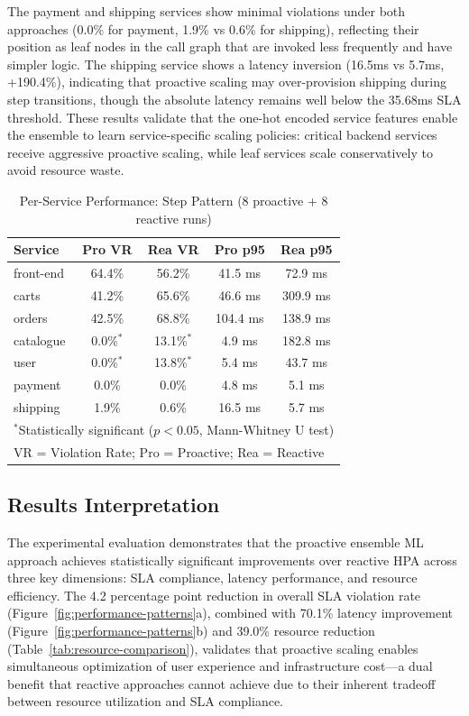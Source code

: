 \documentclass[conference]{IEEEtran}
\begin{document}
The payment and shipping services show minimal violations under both approaches (0.0\% for payment, 1.9\% vs 0.6\% for shipping), reflecting their position as leaf nodes in the call graph that are invoked less frequently and have simpler logic. The shipping service shows a latency inversion (16.5ms vs 5.7ms, +190.4\%), indicating that proactive scaling may over-provision shipping during step transitions, though the absolute latency remains well below the 35.68ms SLA threshold. These results validate that the one-hot encoded service features enable the ensemble to learn service-specific scaling policies: critical backend services receive aggressive proactive scaling, while leaf services scale conservatively to avoid resource waste.

\begin{table}[htbp]
\caption{Per-Service Performance: Step Pattern (8 proactive + 8 reactive runs)}
\begin{center}
\small
\begin{tabular}{|l|c|c|c|c|}
\hline
\textbf{Service} & \textbf{Pro VR} & \textbf{Rea VR} & \textbf{Pro p95} & \textbf{Rea p95} \\
\hline
front-end & 64.4\% & 56.2\% & 41.5 ms & 72.9 ms \\
carts & 41.2\% & 65.6\% & 46.6 ms & 309.9 ms \\
orders & 42.5\% & 68.8\% & 104.4 ms & 138.9 ms \\
catalogue & 0.0\%$^*$ & 13.1\%$^*$ & 4.9 ms & 182.8 ms \\
user & 0.0\%$^*$ & 13.8\%$^*$ & 5.4 ms & 43.7 ms \\
payment & 0.0\% & 0.0\% & 4.8 ms & 5.1 ms \\
shipping & 1.9\% & 0.6\% & 16.5 ms & 5.7 ms \\
\hline
\multicolumn{5}{l}{\footnotesize $^*$Statistically significant ($p < 0.05$, Mann-Whitney U test)} \\
\multicolumn{5}{l}{\footnotesize VR = Violation Rate; Pro = Proactive; Rea = Reactive} \\
\end{tabular}
\label{tab:per-service-step}
\end{center}
\end{table}

\subsection{Results Interpretation}

The experimental evaluation demonstrates that the proactive ensemble ML approach achieves statistically significant improvements over reactive HPA across three key dimensions: SLA compliance, latency performance, and resource efficiency. The 4.2 percentage point reduction in overall SLA violation rate (Figure~\ref{fig:performance-patterns}a), combined with 70.1\% latency improvement (Figure~\ref{fig:performance-patterns}b) and 39.0\% resource reduction (Table~\ref{tab:resource-comparison}), validates that proactive scaling enables simultaneous optimization of user experience and infrastructure cost---a dual benefit that reactive approaches cannot achieve due to their inherent tradeoff between resource utilization and SLA compliance.
\end{document}
